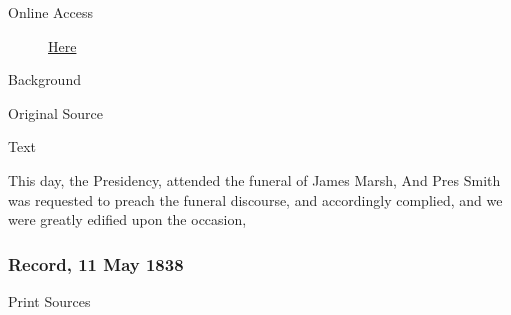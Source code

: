 				\begin{description}
					\item[Online Access] \href{https://www.josephsmithpapers.org/paper-summary/journal-march-september-1838/25}{Here}
				\end{description}
				
				\begin{description}
					\item[Background]
				\end{description}
				
				
				\begin{description}
					\item[Original Source]
				\end{description}
				
				
				\begin{description}
					\item[Text]
				\end{description}
				
					This day, the Presidency, attended the funeral of James Marsh, And Pres Smith was requested to preach the funeral discourse, and accordingly complied, and we were greatly edified upon the occasion,
					
		\subsubsection{Record, 11 May 1838}
			\label{EMS-1838-JS-11-MAY-1838}
			
			\begin{description}
					\item[Print Sources]
				\end{description}

